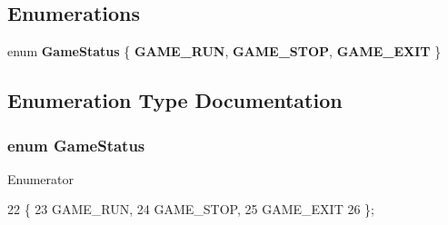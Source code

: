 \subsection*{Enumerations}
\begin{DoxyCompactItemize}
\item 
enum {\bf Game\+Status} \{ {\bf G\+A\+M\+E\+\_\+\+R\+U\+N}, 
{\bf G\+A\+M\+E\+\_\+\+S\+T\+O\+P}, 
{\bf G\+A\+M\+E\+\_\+\+E\+X\+I\+T}
 \}
\end{DoxyCompactItemize}


\subsection{Enumeration Type Documentation}
\subsubsection[{Game\+Status}]{\setlength{\rightskip}{0pt plus 5cm}enum {\bf Game\+Status}}\label{_control_system_8h_a881b49e3802366255ad852f1c8624fd1}
\begin{Desc}
\item[Enumerator]\par
\begin{description}
\item[{\em 
G\+A\+M\+E\+\_\+\+R\+U\+N\label{_control_system_8h_a881b49e3802366255ad852f1c8624fd1ae3d2544aa751d1f73420151551ce2a98}
}]\item[{\em 
G\+A\+M\+E\+\_\+\+S\+T\+O\+P\label{_control_system_8h_a881b49e3802366255ad852f1c8624fd1a677983773881124d07d5b83f8c3b5f7e}
}]\item[{\em 
G\+A\+M\+E\+\_\+\+E\+X\+I\+T\label{_control_system_8h_a881b49e3802366255ad852f1c8624fd1ae601d1e9c9e0ba93d00a18048fa19feb}
}]\end{description}
\end{Desc}

\begin{DoxyCode}
22 \{
23     GAME_RUN,
24     GAME_STOP,
25     GAME_EXIT
26 \};
\end{DoxyCode}
